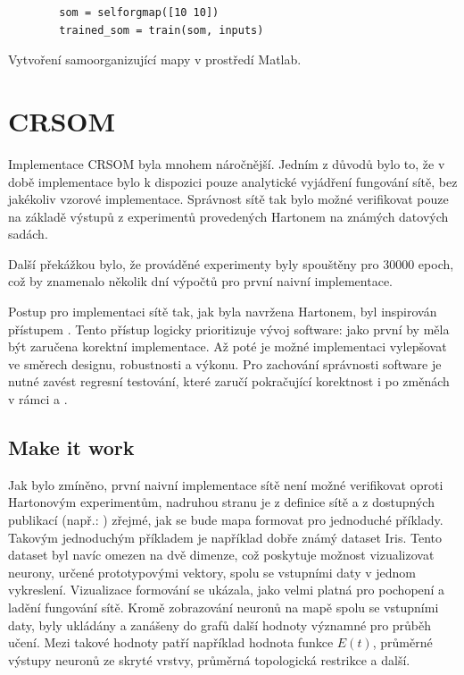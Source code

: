 \documentclass[thesis=M,czech]{FITthesis}[2012/06/26]
\begin{document}
\begin{listing}
    \begin{verbatim}
        som = selforgmap([10 10])
        trained_som = train(som, inputs)
    \end{verbatim} 
    \caption{Vytvoření samoorganizující mapy v prostředí Matlab.} 
    \label{somcode}
\end{listing}

\section{CRSOM}\label{sec:crsom_impl}


Implementace CRSOM byla mnohem náročnější. Jedním z důvodů bylo to, že v době implementace bylo k dispozici pouze analytické vyjádření fungování sítě, bez jakékoliv vzorové implementace.
Správnost sítě tak bylo možné verifikovat pouze na základě výstupů z experimentů provedených Hartonem na známých datových sadách\cite{hartono14}.

Další překážkou bylo, že prováděné experimenty byly spouštěny pro $30 000$ epoch, což by znamenalo několik dní výpočtů pro první naivní implementace.
	
Postup pro implementaci sítě tak, jak byla navržena Hartonem, byl inspirován přístupem \textit{}\cite{makeit}. 
Tento přístup logicky prioritizuje vývoj software: jako první by měla být zaručena korektní implementace. Až poté je možné implementaci vylepšovat ve směrech designu, robustnosti a výkonu. Pro zachování správnosti software je nutné zavést regresní testování, které zaručí pokračující korektnost i po změnách v rámci  a .

\subsection{Make it work}
 Jak bylo zmíněno, první naivní implementace sítě není možné verifikovat oproti Hartonovým experimentům, nadruhou stranu je z definice sítě a z dostupných publikací (např.: \cite{hartono14}) zřejmé, jak se bude mapa formovat pro jednoduché příklady. Takovým jednoduchým příkladem je například dobře známý dataset Iris. Tento dataset byl navíc omezen na dvě dimenze, což poskytuje možnost vizualizovat neurony, určené prototypovými vektory, spolu se vstupními daty v jednom vykreslení. Vizualizace formování se ukázala, jako velmi platná pro pochopení a ladění fungování sítě. Kromě zobrazování neuronů na mapě spolu se vstupními daty, byly ukládány a zanášeny do grafů další hodnoty významné pro průběh učení. Mezi takové hodnoty patří například hodnota funkce $E(t)$, průměrné výstupy neuronů ze skryté vrstvy, průměrná topologická restrikce a další.
 
\end{document}
